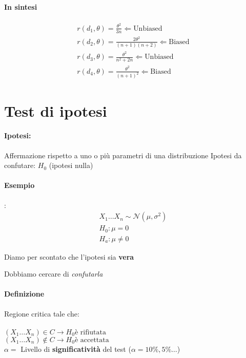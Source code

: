 \documentclass[]{article}
\begin{document}
    \paragraph{In sintesi}
    \begin{equation*}
        \begin{aligned}
            r(d_1, \theta) = \frac{\theta^2}{3n} \Leftarrow \text{Unbiased} \\
            r(d_2, \theta) = \frac{2\theta^2}{(n+1)(n+2)} \Leftarrow \text{Biased} \\
            r(d_3, \theta) = \frac{\theta^2}{n^2 + 2n} \Leftarrow \text{Unbiased} \\
            r(d_4, \theta) = \frac{\theta^2}{(n+1)^2} \Leftarrow \text{Biased}
        \end{aligned}
    \end{equation*}
    \section{Test di ipotesi}
    \paragraph{Ipotesi:} Affermazione rispetto a uno o più parametri di una distribuzione
    Ipotesi da confutare: $H_0$ (ipotesi nulla) \\
    \paragraph{Esempio}:
    \begin{equation}
        \begin{aligned}
            X_1 \ldots X_n \sim \mathcal{N}(\mu, \sigma^2) \\
            H_0 : \mu = 0 \\
            H_a : \mu \not = 0
        \end{aligned}
    \end{equation}
    \centerline{Diamo per scontato che l'ipotesi sia \textbf{vera}}
    \centerline{Dobbiamo cercare di \textit{confutarla}}
    \paragraph{Definizione} Regione critica tale che: \\\\
    $(X_1 \ldots X_n) \in C \rightarrow H_0 \text{è rifiutata}$ \\
    $(X_1 \ldots X_n) \not\in C \rightarrow H_0 \text{è accettata}$ \\
    $\alpha = $ Livello di \textbf{significatività} del test ($\alpha = 10\%, 5\% \ldots$)
\end{document}
